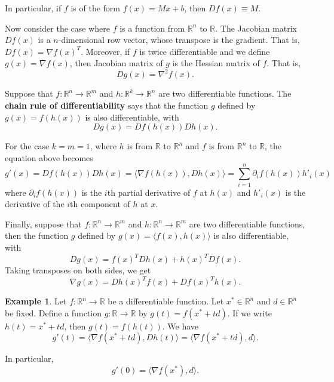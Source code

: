 \documentclass[12pt,oneside]{article}
\newcommand{\ip}[2]{\ensuremath{\langle #1,#2\rangle}}
\newcommand{\Rset}{\mathbb{R}}
\begin{document}
In particular, if $f$ is of the form $f(x)=Mx + b$, then $Df (x) \equiv M$.

\vspace{4mm}

   Now consider the case where $f$ is a function from $\Rset^n$ to $\Rset$. The Jacobian matrix $Df(x)$ is a $n$-dimensional row vector, whose transpose is the gradient. That is, $Df(x) = \nabla f(x)^T$.
 Moreover, if $f$ is twice differentiable and we define $g (x)= \nabla f(x)$, then Jacobian matrix of $g$ is the Hessian matrix of $f$. That is,
 \[Dg(x) = \nabla^2 f(x).\]

\vspace{4mm}

Suppose that $f:\Rset^n\to \Rset^m$ and $h:\Rset^k \to \Rset^n$ are two differentiable functions. The \textbf{chain rule of differentiability} says that the function $g$ defined by $g(x) =f( h(x))$ is also differentiable, with
$$D g(x) = Df(h(x)) Dh(x).$$

For the case $k=m=1$, where $h$ is from $\Rset$ to $\Rset^n$ and $f$ is from $\Rset^n$ to $\Rset$, the equation above becomes
\[
g'(x)= Df(h(x)) D h(x) = \ip{\nabla f(h(x))}{Dh(x)} = \sum_{i=1}^n \partial_i f (h(x)) h'_i(x)
\]
where $\partial_i f (h(x))$ is the $i$th partial derivative of $f$ at $h(x)$ and $h'_i(x)$ is the derivative of the $i$th component of $h$ at $x$.

\vspace{4mm}

Finally, suppose that $f:\Rset^n \to \Rset^m$ and $h:\Rset^n \to \Rset^m$ are two differentiable functions, then the function $g$ defined by $g(x)=\ip{f(x)}{h(x)}$ is also differentiable, with
\[
D g(x)= f(x)^T Dh(x)  + h(x)^T Df(x).
\]
Taking transposes on both sides, we get
\[
\nabla g(x)= Dh(x)^T f(x)   + Df(x)^T h(x).
\]

\vspace{4mm}

\noindent
\textbf{Example 1}. Let $f: \Rset^n \to \Rset$ be a differentiable function. Let $x^* \in \Rset^n$ and $d \in \Rset^n$ be fixed.
    Define a function $g:\Rset \to \Rset$ by $g(t) = f(x^* + t d)$. If we write $h(t)=x^*+td$, then $g(t)=f(h(t))$. We have
    $$g'(t)= \ip{\nabla f(x^*+td)}{ Dh(t)}=\ip{\nabla f(x^*+td)}{d}.$$
    
    In particular,
    $$g'(0)= \ip{\nabla f(x^*)}{d}.$$

\end{document}
